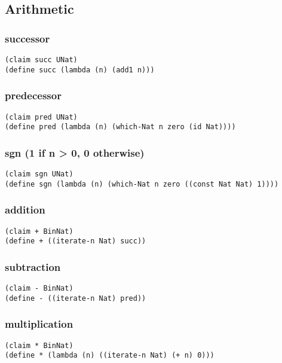 \subsection{Arithmetic}

\subsubsection{successor} \label{code:successor}
\begin{verbatim}
(claim succ UNat)
(define succ (lambda (n) (add1 n)))
\end{verbatim}

\subsubsection{predecessor} \label{code:predecessor}
\begin{verbatim}
(claim pred UNat)
(define pred (lambda (n) (which-Nat n zero (id Nat))))
\end{verbatim}

\subsubsection{sgn (1 if n > 0, 0 otherwise)} \label{code:sgn}
\begin{verbatim}
(claim sgn UNat)
(define sgn (lambda (n) (which-Nat n zero ((const Nat Nat) 1))))
\end{verbatim}

\subsubsection{addition} \label{code:addition}
\begin{verbatim}
(claim + BinNat)
(define + ((iterate-n Nat) succ))
\end{verbatim}

\subsubsection{subtraction} \label{code:subtraction}
\begin{verbatim}
(claim - BinNat)
(define - ((iterate-n Nat) pred))
\end{verbatim}

\subsubsection{multiplication} \label{code:multiplication}
\begin{verbatim}
(claim * BinNat)
(define * (lambda (n) ((iterate-n Nat) (+ n) 0)))
\end{verbatim}

